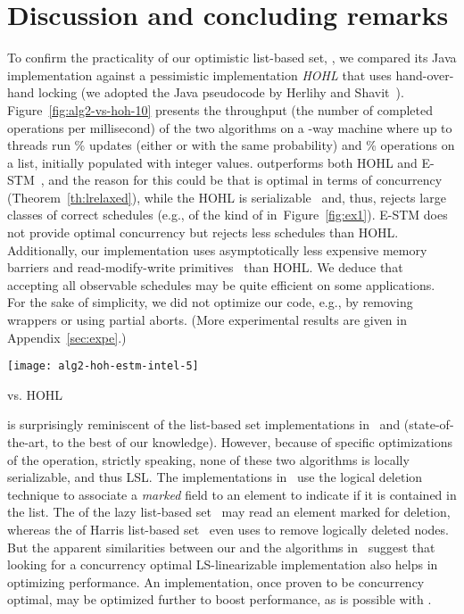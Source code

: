\documentclass[11pt,pdftex,letterpaper]{article}
\begin{document}
 \section{Discussion and concluding remarks}
\label{sec:conc}
To confirm the practicality of our optimistic list-based set, ,
we compared its Java implementation against a pessimistic
implementation \emph{HOHL}
that uses hand-over-hand locking (we adopted the Java pseudocode by Herlihy and 
Shavit~\cite[Chapter 9]{HS08-book}). 
Figure~\ref{fig:alg2-vs-hoh-10} presents the throughput 
(the number of completed operations per millisecond) 
of the two algorithms on a -way machine 
where up to  threads run \% updates 
(either  or  with the same probability) 
and \%  operations on a list, initially populated
with  integer values. 
 outperforms both HOHL and E-STM~\cite{FGG09}, and 
the reason for this could be 
that  is optimal in terms of concurrency (Theorem~\ref{th:lrelaxed}), 
while the HOHL is serializable~\cite{ARR10} and, thus, rejects
large classes of correct schedules (e.g., of the kind of  in~Figure~\ref{fig:ex1}). 
E-STM does not provide optimal concurrency but rejects less schedules than HOHL.
Additionally, our implementation uses asymptotically less expensive
memory barriers and read-modify-write primitives~\cite{AGK11-popl}
than HOHL.
We deduce that accepting all observable schedules may be 
quite efficient on some applications.
For the sake of simplicity, we did not optimize our code, e.g., 
by removing wrappers or using partial aborts.
(More experimental results are given in Appendix~\ref{sec:expe}.)


\begin{floatingfigure}[right]{0.27\paperwidth}
{\small
\hspace{-2em}\texttt{[image: alg2-hoh-estm-intel-5]}
   \caption{ vs. HOHL\label{fig:alg2-vs-hoh-10}}
}\end{floatingfigure}


 is surprisingly reminiscent of the
list-based set implementations in~\cite{HHL+05} and \cite{harris-set}
(state-of-the-art, to the best of our knowledge).
However, because of specific optimizations of the 
operation, strictly speaking, none of these two algorithms is locally
serializable, and thus LSL.
The implementations in~\cite{HHL+05,harris-set}
use the logical deletion technique to associate a \emph{marked} field to an element to indicate if it
is contained in the list.
The  of the lazy list-based set~\cite{HHL+05} may read an element marked for deletion, whereas
the  of Harris list-based set~\cite{harris-set} even uses  to remove logically deleted nodes.
But the apparent similarities between our  and the algorithms
in~\cite{HHL+05,harris-set} suggest
that looking for a concurrency optimal LS-linearizable
implementation also helps in optimizing performance.  
An implementation, once proven to be concurrency optimal, may
be optimized further to boost performance, as is possible with .
\end{document}
